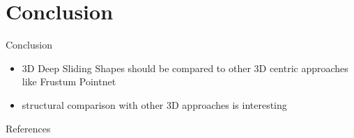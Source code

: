 \documentclass{beamer}
\begin{document}
\section{Conclusion}
\begin{frame}{Conclusion}
    \begin{itemize}
        \item 3D Deep Sliding Shapes should be compared to other 3D centric approaches
              like Frustum Pointnet
        \vfill
        \item structural comparison with other 3D approaches is interesting
    \end{itemize}
\end{frame}

\begin{frame}[allowframebreaks]{References}
    \printbibliography
\end{frame}
\end{document}
